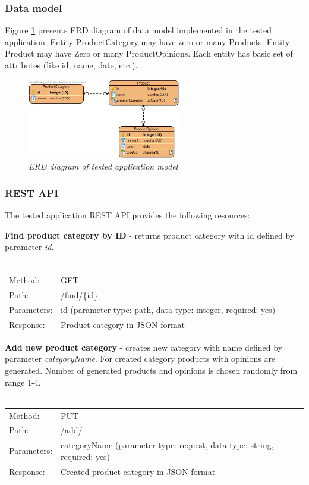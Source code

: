 \documentclass[10pt,a4paper]{article}
\begin{document}
\subsubsection{Data model} 
Figure \ref{erd} presents ERD diagram of data model implemented in the tested application. Entity ProductCategory may have zero or many Products. Entity Product may have Zero or many ProductOpinions. Each entity has basic set of attributes (like id, name, date, etc.).  

\begin{figure}[h]
\centering
\includegraphics[width=0.6\textwidth]{erd}
\caption{\textit{ERD diagram of tested application model}}
\label{erd}
\end{figure}

\subsubsection{REST API} 
The tested application REST API provides the following resources:
\vspace{3mm}

\noindent\textbf{Find product category by ID} - returns product category with id defined by parameter \textit{id}.\\
\\
  \begin{tabular}{ll}
  Method: & GET\\
  Path: & /find/\{id\}\\
  Parameters: & id (parameter type: path, data type: integer, required: yes)\\
  Response: & Product category in JSON format \\
  \end{tabular} \vspace{5mm}

\noindent\textbf{Add new product category} - creates new category with name defined by parameter \textit{categoryName}. For created category products with opinions are generated. Number of generated products and opinions is chosen randomly from range 1-4. \\
\\
  \begin{tabular}{ll}
  Method: & PUT \\
  Path: & /add/ \\
  Parameters: & categoryName (parameter type: request, data type: string, required: yes)\\
  Response: & Created product category in JSON format  \\
  \end{tabular} \vspace{5mm}
\end{document}
